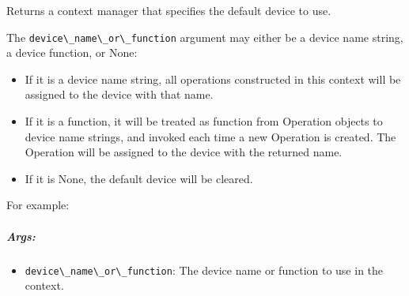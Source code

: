 Returns a context manager that specifies the default device to use.

The \lstinline{device\_name\_or\_function} argument may either be a device
name string, a device function, or None:

\begin{itemize}
\tightlist
\item
  If it is a device name string, all operations constructed in this
  context will be assigned to the device with that name.
\item
  If it is a function, it will be treated as function from Operation
  objects to device name strings, and invoked each time a new Operation
  is created. The Operation will be assigned to the device with the
  returned name.
\item
  If it is None, the default device will be cleared.
\end{itemize}

For example:

\begin{Shaded}
\begin{Highlighting}[]
 \NormalTok{):}
   \NormalTok{):}

 
    \OperatorTok{==} \NormalTok{:}
     
  \NormalTok{:}
     

 
\end{Highlighting}
\end{Shaded}

\subparagraph{Args: }\label{args-2}

\begin{itemize}
\tightlist
\item
  \lstinline{device\_name\_or\_function}: The device name or function to
  use in the context.
\end{itemize}

